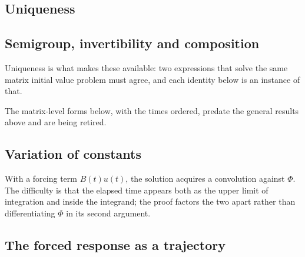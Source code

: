 







\subsection{Uniqueness}





\subsection{Semigroup, invertibility and composition}

Uniqueness is what makes these available: two expressions that solve the same matrix initial
value problem must agree, and each identity below is an instance of that.





The matrix-level forms below, with the times ordered, predate the general results above and
are being retired.







\subsection{Variation of constants}

With a forcing term $B(t)u(t)$, the solution acquires a convolution against $\Phi$. The
difficulty is that the elapsed time appears both as the upper limit of integration and inside the
integrand; the proof factors the two apart rather than differentiating $\Phi$ in its second
argument.




\subsection{The forced response as a trajectory}

